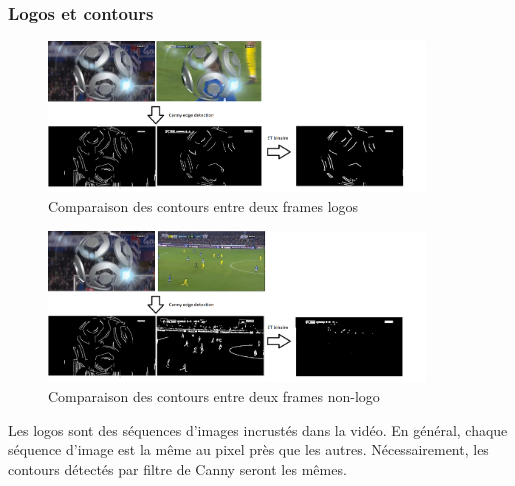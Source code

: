 \documentclass[11pt]{article}
\begin{document}
\subsubsection{Logos et contours}
\label{sec:org0a7f4a3}
\begin{figure}[htbp]
\centering
\includegraphics[width=10cm]{comparison_idea.png}
\caption{Comparaison des contours entre deux frames logos}
\end{figure}
\begin{figure}[htbp]
\centering
\includegraphics[width=10cm]{comparison_idea2.png}
\caption{Comparaison des contours entre deux frames non-logo}
\end{figure}

Les logos sont des séquences d'images incrustés dans la vidéo. En général, chaque séquence d'image est la même au pixel près que les autres. Nécessairement, les contours détectés par filtre de Canny seront les mêmes.\\
\end{document}
